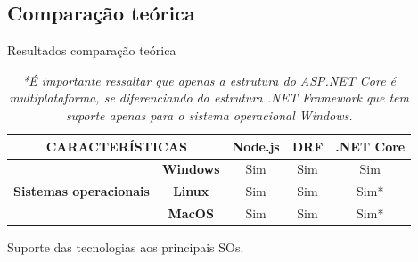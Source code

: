 \documentclass{libs/ufc_format}
\begin{document}
\subsection{Comparação teórica}
\begin{frame}{Resultados comparação teórica}
    \begin{table}[H]
        \centering
        \begin{tabular}{|cc|c|c|c|}
        \hline
        \multicolumn{2}{|c|}{\textbf{CARACTERÍSTICAS}}                                           & \textbf{Node.js} & \textbf{DRF} & \textbf{.NET Core} \\ \hline
        \multicolumn{1}{|c|}{\multirow{3}{*}{\textbf{Sistemas operacionais}}} & \textbf{Windows} & Sim              & Sim          & Sim                   \\ \cline{2-5} 
        \multicolumn{1}{|c|}{}                                                & \textbf{Linux}   & Sim              & Sim          & Sim*                  \\ \cline{2-5} 
        \multicolumn{1}{|c|}{}                                                & \textbf{MacOS}   & Sim              & Sim          & Sim*                  \\ \hline
        \end{tabular}
        \captionsetup{justification=centering}
        \caption{Suporte das tecnologias aos principais SOs.}
        \caption*{\textit{*É importante ressaltar que apenas a estrutura do ASP.NET Core é multiplataforma, se diferenciando da estrutura .NET Framework que tem suporte apenas para o sistema operacional Windows.}}
        \label{tab:resultado-so}
    \end{table}
\end{frame}
\end{document}
